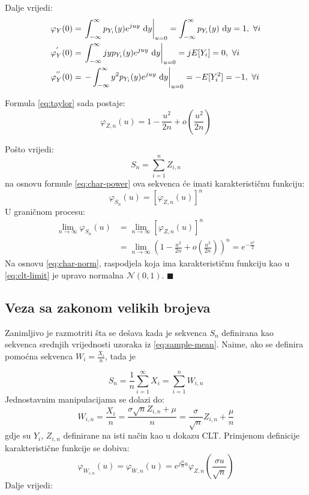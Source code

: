 Dalje vrijedi:
\begin{align*}
  \varphi_Y(0)
    &= \left.\int_{-\infty}^{\infty} p_{Y_i}(y) e^{juy} \ \text dy\right|_{u=0}
    = \int_{-\infty}^{\infty} p_{Y_i}(y) \ \text dy = 1,\  \forall i \\
  \varphi_Y^{'}(0)
    &= \left.\int_{-\infty}^{\infty} jyp_{Y_i}(y)e^{juy} \ \text dy \right|_{u=0}
    = jE[Y_i] = 0,\ \forall i \\
  \varphi_Y^{''}(0)
    &= \left.-\int_{-\infty}^{\infty} y^2 p_{Y_i}(y)e^{juy} \ \text dy\right|_{u=0}
    = -E[Y_i^2] = -1,\ \forall i
\end{align*}

Formula \eqref{eq:taylor} sada postaje:
\begin{equation}
  \varphi_{Z,n}(u) = 1 - \frac{u^2}{2n} + o\left(\frac{u^2}{2n}\right)
\end{equation}

Pošto vrijedi:
\begin{equation}
  S_n = \sum_{i=1}^{n} Z_{i,n}
\end{equation}
na osnovu formule \eqref{eq:char-power} ova sekvenca će imati karakterističnu
funkciju:
\begin{equation}
  \varphi_{S_n}(u) = \left[\varphi_{Z,n}(u)\right]^n
\end{equation}
U graničnom procesu:
\begin{align*} \label{eq:clt-limit}
  \lim_{n\to\infty} \varphi_{S_n}(u)
  &= \lim_{n\to\infty} [\varphi_{Z,n}(u)]^n \nonumber \\
  &= \lim_{n\to\infty}
    \left(1 - \frac{u^2}{2n} + o\left(\frac{u^2}{2n}\right)\right)^n
    = e^{-\frac{u^2}{2}}
\end{align*}
Na osnovu \eqref{eq:char-norm}, raspodjela koja ima karakterističnu funkciju kao
u \eqref{eq:clt-limit} je upravo normalna $\mathcal{N}(0,1)$. $\blacksquare$ \\

\subsection{Veza sa zakonom velikih brojeva} \label{sec:clt-lln}

Zanimljivo je razmotriti šta se dešava kada je sekvenca $S_n$ definirana kao
sekvenca srednjih vrijednosti uzoraka iz \eqref{eq:sample-mean}. Naime, ako se
definira pomoćna sekvenca $W_i = \frac{X_i}{n}$, tada je

\begin{equation}
  S_n = \frac{1}{n}\sum_{i=1}^{\infty} X_i = \sum_{i=1}^{n} W_{i,n}
\end{equation}
%
Jednostavnim manipulacijama se dolazi do:
\begin{equation}
  W_{i,n} = \frac{X_i}{n} = \frac{\sigma \sqrt{n} Z_{i,n}+\mu}{n}
  = \frac{\sigma}{\sqrt{n}} Z_{i,n} + \frac{\mu}{n}
\end{equation}
gdje su $Y_i$, $Z_{i,n}$ definirane na isti način kao u dokazu CLT.
%
Primjenom definicije karakteristične funkcije se dobiva:
\begin{equation}
  \varphi_{W_{i,n}}(u) = \varphi_{W,n}(u)
  = e^{j\frac{\mu}{n} u} \varphi_{Z,n}\left(\frac{\sigma u}{\sqrt{n}}\right)
\end{equation}
%
Dalje vrijedi:

